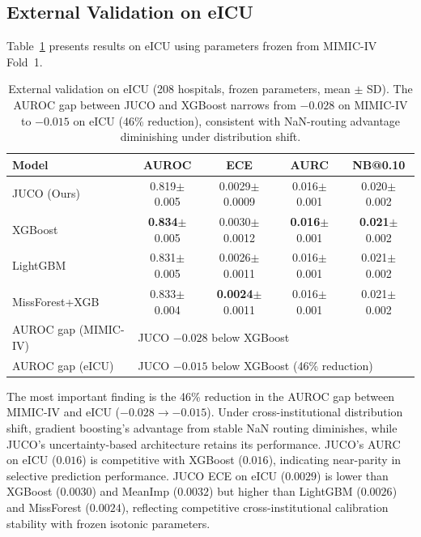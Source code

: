 \documentclass[a4paper,fleqn,longmktitle]{cas-sc}
\begin{document}
	\subsection{External Validation on eICU}
	\label{sec:eicu_results}
	
	Table~\ref{tab:eicu_results} presents results on eICU using
	parameters frozen from MIMIC-IV Fold~1.
	
	\begin{table}[ht]
		\centering
		\caption{External validation on eICU (208 hospitals, frozen parameters,
			mean $\pm$ SD). The AUROC gap between JUCO and XGBoost narrows from
			$-0.028$ on MIMIC-IV to $-0.015$ on eICU (46\% reduction),
			consistent with NaN-routing advantage diminishing under distribution shift.}
		\label{tab:eicu_results}
		\small
		\begin{tabular}{lcccc}
			\toprule
			\textbf{Model} & \textbf{AUROC} & \textbf{ECE} & \textbf{AURC} & \textbf{NB@0.10} \\
			\midrule
			JUCO (Ours)    & 0.819$\pm$0.005 & 0.0029$\pm$0.0009 & 0.016$\pm$0.001 & 0.020$\pm$0.002 \\
			XGBoost        & \textbf{0.834}$\pm$0.005 & 0.0030$\pm$0.0012 & \textbf{0.016}$\pm$0.001 & \textbf{0.021}$\pm$0.002 \\
			LightGBM       & 0.831$\pm$0.005 & 0.0026$\pm$0.0011 & 0.016$\pm$0.001 & 0.021$\pm$0.002 \\
			MissForest+XGB & 0.833$\pm$0.004 & \textbf{0.0024}$\pm$0.0011 & 0.016$\pm$0.001 & 0.021$\pm$0.002 \\
			\midrule
			AUROC gap (MIMIC-IV) & \multicolumn{4}{l}{JUCO $-0.028$ below XGBoost} \\
			AUROC gap (eICU)     & \multicolumn{4}{l}{JUCO $-0.015$ below XGBoost (46\% reduction)} \\
			\bottomrule
		\end{tabular}
	\end{table}

	The most important finding is the 46\% reduction in the AUROC
	gap between MIMIC-IV and eICU ($-0.028 \to -0.015$).
	Under cross-institutional distribution shift, gradient boosting's
	advantage from stable NaN routing diminishes, while JUCO's
	uncertainty-based architecture retains its performance.
	JUCO's AURC on eICU ($0.016$) is competitive with XGBoost ($0.016$),
	indicating near-parity in selective prediction performance.
	JUCO ECE on eICU ($0.0029$) is lower than XGBoost ($0.0030$)
	and MeanImp ($0.0032$) but higher than LightGBM ($0.0026$) and
	MissForest ($0.0024$), reflecting competitive cross-institutional
	calibration stability with frozen isotonic parameters.
	
\end{document}
